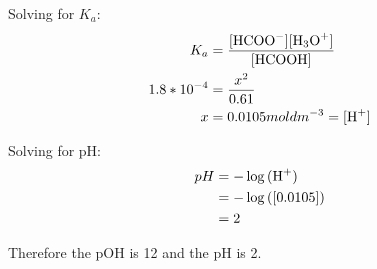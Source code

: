 \documentclass{article}
\begin{document}
\begin{enumerate}
Solving for $K_{a}$:
\begin{align*}
K_a &= \frac{[\ce{HCOO-}][\ce{H3O+}]}{[\ce{HCOOH}]}\\
1.8*10^{-4} &= \frac{x^2}{0.61}\\
x&= 0.0105 mol dm^{-3} = [\ce{H+}]\\
\end{align*}

Solving for pH:
\begin{align*}
pH &= -\log{(\ce{H+})}\\
&= -\log{([0.0105])}\\
&= 2
\end{align*}

Therefore the pOH is 12 and the pH is 2.



\end{enumerate}
\end{document}

